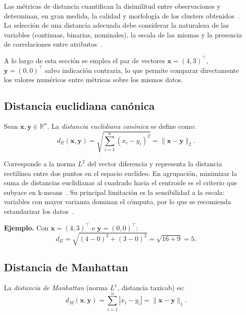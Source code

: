 Las métricas de distancia cuantifican la disimilitud entre observaciones y determinan, en gran medida, la calidad y morfología de los clusters obtenidos~\cite{jain1999clustering}. La selección de una distancia adecuada debe considerar la naturaleza de las variables (continuas, binarias, nominales), la escala de las mismas y la presencia de correlaciones entre atributos~\cite{aggarwal2001surprising}.

A lo largo de esta sección se emplea el par de vectores $\mathbf{x}=(4,3)^{\top}$, $\mathbf{y}=(0,0)^{\top}$ salvo indicación contraria, lo que permite comparar directamente los valores numéricos entre métricas sobre los mismos datos.

\subsection{Distancia euclidiana canónica}

\begin{definition}
Sean $\mathbf{x},\mathbf{y}\in\mathbb{R}^n$. La \emph{distancia euclidiana canónica} se define como:
\[
d_E(\mathbf{x},\mathbf{y}) = \sqrt{\sum_{i=1}^{n}(x_i - y_i)^2} = \|\mathbf{x} - \mathbf{y}\|_2.
\]
\end{definition}

Corresponde a la norma $L^2$ del vector diferencia y representa la distancia rectilínea entre dos puntos en el espacio euclídeo. En agrupación, minimizar la suma de distancias euclidianas al cuadrado hacia el centroide es el criterio que subyace en k-means~\cite{duda2001pattern}. Su principal limitación es la sensibilidad a la escala: variables con mayor varianza dominan el cómputo, por lo que se recomienda estandarizar los datos~\cite{aggarwal2001surprising}.

\textbf{Ejemplo.} Con $\mathbf{x}=(4,3)^{\top}$ e $\mathbf{y}=(0,0)^{\top}$:
\[
d_E = \sqrt{(4-0)^2 + (3-0)^2} = \sqrt{16+9} = 5.
\]

\subsection{Distancia de Manhattan}

\begin{definition}
La \emph{distancia de Manhattan} (norma $L^1$, distancia taxicab) es:
\[
d_M(\mathbf{x},\mathbf{y}) = \sum_{i=1}^{n}|x_i - y_i| = \|\mathbf{x} - \mathbf{y}\|_1.
\]
\end{definition}

